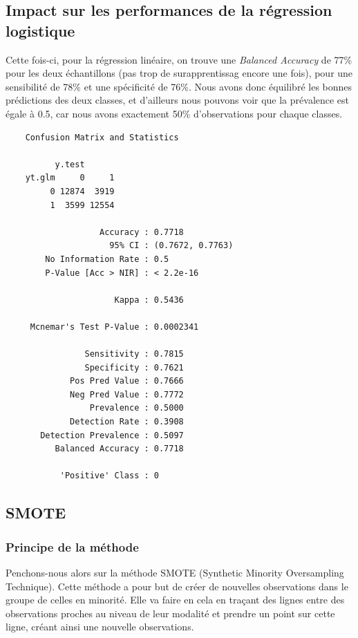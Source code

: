 \documentclass{article}
\begin{document}
\subsection{Impact sur les performances de la régression logistique}

Cette fois-ci, pour la régression linéaire, on trouve une \emph{Balanced Accuracy} de 77\% pour les deux échantillons (pas trop de surapprentissag encore une fois), pour une sensibilité de 78\% et une spécificité de 76\%. Nous avons donc équilibré les bonnes prédictions des deux classes, et d'ailleurs nous pouvons voir que la prévalence est égale à 0.5, car nous avons exactement 50\% d'observations pour chaque classes. 

\begin{multicols}{2}
    \begin{verbatim}
    Confusion Matrix and Statistics

          y.test
    yt.glm     0     1
         0 12874  3919
         1  3599 12554

                   Accuracy : 0.7718          
                     95% CI : (0.7672, 0.7763)
        No Information Rate : 0.5             
        P-Value [Acc > NIR] : < 2.2e-16       

                      Kappa : 0.5436          

     Mcnemar's Test P-Value : 0.0002341       

                Sensitivity : 0.7815          
                Specificity : 0.7621          
             Pos Pred Value : 0.7666          
             Neg Pred Value : 0.7772          
                 Prevalence : 0.5000          
             Detection Rate : 0.3908          
       Detection Prevalence : 0.5097          
          Balanced Accuracy : 0.7718          

           'Positive' Class : 0
    \end{verbatim}
\end{multicols}

\subsection{SMOTE}

\subsubsection{Principe de la méthode}

Penchons-nous alors sur la méthode SMOTE (Synthetic Minority Oversampling Technique). Cette méthode a pour but de créer de nouvelles observations dans le groupe de celles en minorité. Elle va faire en cela en traçant des lignes entre des observations proches au niveau de leur modalité et prendre un point sur cette ligne, créant ainsi une nouvelle observations. 
\end{document}
